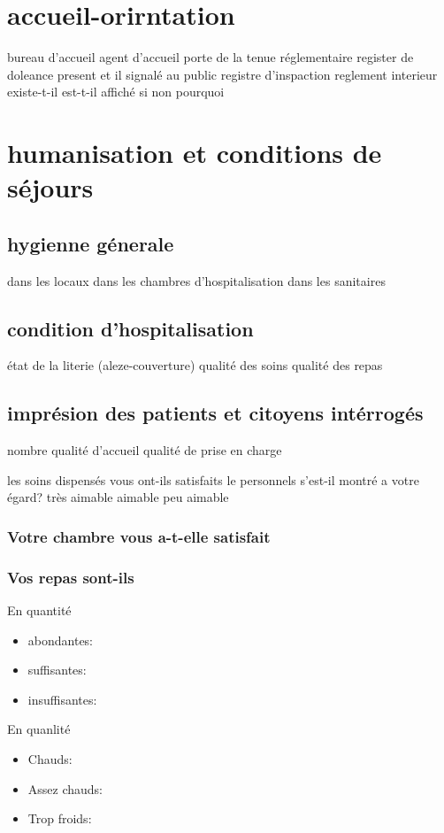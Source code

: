 \documentclass{tiba}
\begin{document}
\section*{accueil-orirntation}
bureau d'accueil
agent  d'accueil
porte de la tenue réglementaire
register de doleance
  present
  et il signalé au public
registre d'inspaction
reglement interieur
existe-t-il 
est-t-il affiché
si non pourquoi

\section*{humanisation et conditions de séjours}
\subsection*{hygienne génerale}
dans les locaux
dans les chambres d'hospitalisation
dans les sanitaires
\subsection*{condition d'hospitalisation}
état de la literie (aleze-couverture)
qualité des soins
qualité des repas
\subsection*{imprésion des patients et citoyens intérrogés}
nombre
qualité d'accueil
qualité de prise en charge

les soins dispensés vous ont-ils satisfaits
le personnels s'est-il montré a votre égard?
  très aimable 
  aimable 
  peu aimable

\subsubsection*{Votre chambre vous a-t-elle satisfait }
\subsubsection*{Vos repas sont-ils}

  En quantité    
\begin{itemize}
  \item abondantes:    \re
  \item suffisantes:   \re
  \item insuffisantes: \re
\end{itemize}

En quanlité 
\begin{itemize}
  \item Chauds: \re
  \item  Assez chauds: \re
  \item  Trop froids: \re
\end{itemize}
\end{document}
